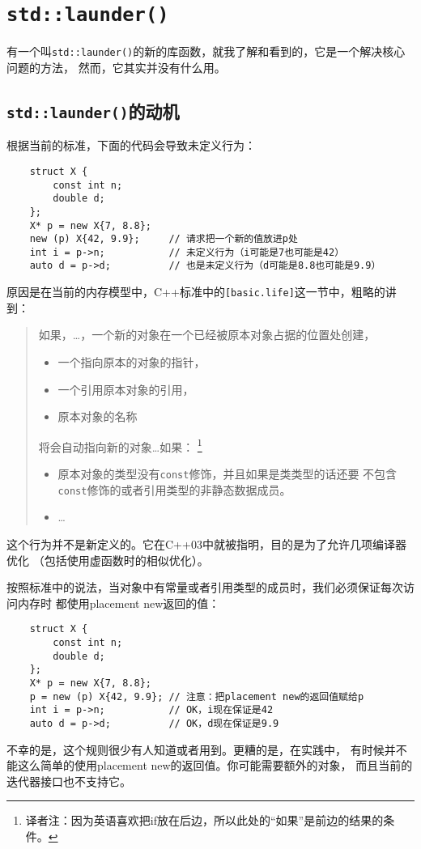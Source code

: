 \chapter{\texttt{std::launder()}}\label{ch32}
有一个叫\texttt{std::launder()}的新的库函数，就我了解和看到的，它是一个解决核心问题的方法，
然而，它其实并没有什么用。


\section{\texttt{std::launder()}的动机}
根据当前的标准，下面的代码会导致未定义行为：
\begin{lstlisting}
    struct X {
        const int n;
        double d;
    };
    X* p = new X{7, 8.8};
    new (p) X{42, 9.9};     // 请求把一个新的值放进p处
    int i = p->n;           // 未定义行为（i可能是7也可能是42）
    auto d = p->d;          // 也是未定义行为（d可能是8.8也可能是9.9）
\end{lstlisting}
原因是在当前的内存模型中，C++标准中的\texttt{[basic.life]}这一节中，粗略的讲到：

\begin{quote}
    如果，\ldots，一个新的对象在一个已经被原本对象占据的位置处创建，
    \begin{itemize}
        \item 一个指向原本的对象的指针，
        \item 一个引用原本对象的引用，
        \item 原本对象的名称
    \end{itemize}
    将会自动指向新的对象\ldots 如果：
    \footnote{译者注：因为英语喜欢把if放在后边，所以此处的“如果”是前边的结果的条件。}
    \begin{itemize}
        \item 原本对象的类型没有\texttt{const}修饰，并且如果是类类型的话还要
        不包含\texttt{const}修饰的或者引用类型的非静态数据成员。
        \item \ldots
    \end{itemize}
\end{quote}
这个行为并不是新定义的。它在C++03中就被指明，目的是为了允许几项编译器优化
（包括使用虚函数时的相似优化）。

按照标准中的说法，当对象中有常量或者引用类型的成员时，我们必须保证每次访问内存时
都使用placement new返回的值：
\begin{lstlisting}
    struct X {
        const int n;
        double d;
    };
    X* p = new X{7, 8.8};
    p = new (p) X{42, 9.9}; // 注意：把placement new的返回值赋给p
    int i = p->n;           // OK，i现在保证是42
    auto d = p->d;          // OK，d现在保证是9.9
\end{lstlisting}
不幸的是，这个规则很少有人知道或者用到。更糟的是，在实践中，
有时候并不能这么简单的使用placement new的返回值。你可能需要额外的对象，
而且当前的迭代器接口也不支持它。

